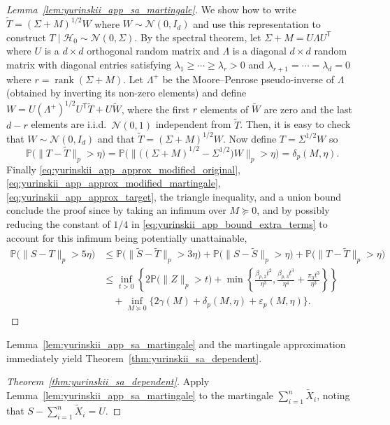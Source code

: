 \documentclass[11pt,lof]{puthesis}
\renewcommand{\P}{\ensuremath{\mathbb{P}}}
\newcommand{\cH}{\ensuremath{\mathcal{H}}}
\newcommand{\cN}{\ensuremath{\mathcal{N}}}
\newcommand{\T}{\ensuremath{\mathsf{T}}}
\DeclareMathOperator{\rank}{rank}
\theoremstyle{break}
\theoremstyle{proof}
\newtheorem{proof}{Proof}
\begin{document}
\begin{proof}[Lemma~\ref{lem:yurinskii_app_sa_martingale}]
We show how to write
$\tilde T = (\Sigma + M)^{1/2} W$
where $W \sim \cN(0,I_d)$
and use this representation to construct
$T \mid \cH_0 \sim \cN(0, \Sigma)$.
By the spectral theorem, let $\Sigma + M = U \Lambda U^\T$
where $U$ is a $d \times d$ orthogonal random matrix
and $\Lambda$ is a diagonal $d \times d$ random matrix with
diagonal entries satisfying
$\lambda_1 \geq \cdots \geq \lambda_r > 0$
and $\lambda_{r+1} = \cdots = \lambda_d = 0$
where $r = \rank (\Sigma + M)$.
Let $\Lambda^+$ be the Moore--Penrose pseudo-inverse of $\Lambda$
(obtained by inverting its non-zero elements) and define
$W = U (\Lambda^+)^{1/2} U^\T \tilde T + U \tilde W$, where
the first $r$ elements of $\tilde W$ are zero
and the last $d-r$ elements are i.i.d.\ $\cN(0,1)$
independent from $\tilde T$.
Then, it is easy to check that
$W \sim \cN(0, I_d)$ and that
$\tilde T = (\Sigma + M)^{1/2} W$.
Now define $T = \Sigma^{1/2} W$ so
%
\begin{equation}%
\label{eq:yurinskii_app_approx_target}
\P\big(\|T - \tilde T\|_p > \eta\big)
= \P\big(\big\|\big((\Sigma + M)^{1/2}
- \Sigma^{1/2} \big) W \big\|_p>\eta \big)
= \delta_p(M, \eta).
\end{equation}
%
Finally
\eqref{eq:yurinskii_app_approx_modified_original},
\eqref{eq:yurinskii_app_approx_modified_martingale},
\eqref{eq:yurinskii_app_approx_target},
the triangle inequality,
and a union bound conclude the proof since
by taking an infimum over $M \succeq 0$,
and by possibly reducing the constant of $1/4$ in
\eqref{eq:yurinskii_app_bound_extra_terms} to account for
this infimum being potentially unattainable,
%
\begin{align*}
\P\big(\|S-T\|_p > 5\eta\big)
&\leq
\P\big(\|\tilde S - \tilde T \|_p > 3\eta \big)
+\P\big(\|S - \tilde S \|_p > \eta\big)
+\P\big(\|T - \tilde T \|_p > \eta\big) \\
&\leq
\inf_{t>0}
\left\{
2 \P\big( \|Z\|_p > t \big)
+ \min\left\{
\frac{\beta_{p,2} t^2}{\eta^3},
\frac{\beta_{p,3} t^3}{\eta^4}
+ \frac{\pi_3 t^3}{\eta^3}
\right\}
\right\} \\
&\quad+
\inf_{M \succeq 0}
\big\{ 2\gamma(M) + \delta_p(M,\eta)
+ \varepsilon_p(M, \eta)\big\}.
\end{align*}
%
\end{proof}

Lemma~\ref{lem:yurinskii_app_sa_martingale} and the martingale approximation
immediately yield Theorem~\ref{thm:yurinskii_sa_dependent}.

\begin{proof}[Theorem~\ref{thm:yurinskii_sa_dependent}]
Apply Lemma~\ref{lem:yurinskii_app_sa_martingale} to
the martingale $\sum_{i=1}^{n} \tilde X_i$,
noting that $S - \sum_{i=1}^{n} \tilde X_i = U$.
\end{proof}
\end{document}
